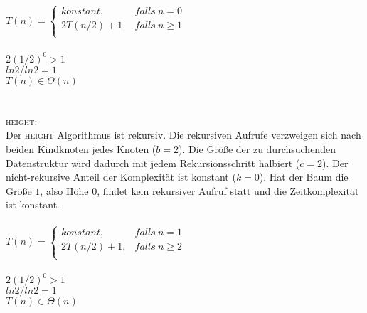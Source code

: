 \documentclass{article}
\begin{document}
$T(n) =
\begin{cases}
konstant, &falls\ n = 0\\
2T(n/2) + 1, &falls\ n \geq 1\\
\end{cases}$\\\\
$2(1/2)^0 > 1$\\
$ln 2 / ln 2 = 1$\\
$T(n) \in \Theta(n)$\\\\\\
\textsc {height}:\\
Der \textsc {height} Algorithmus ist rekursiv. Die rekursiven Aufrufe verzweigen sich nach beiden Kindknoten jedes Knoten ($b = 2$). Die Größe der zu durchsuchenden Datenstruktur wird dadurch mit jedem Rekursionsschritt halbiert ($c = 2$). Der nicht-rekursive Anteil der Komplexität ist konstant ($k = 0$). Hat der Baum die Größe $1$, also Höhe $0$, findet kein rekursiver Aufruf statt und die Zeitkomplexität ist konstant.\\\\
$T(n) =
\begin{cases}
konstant, &falls\ n = 1\\
2T(n/2) + 1, &falls\ n \geq 2\\
\end{cases}$\\\\
$2(1/2)^0 > 1$\\
$ln 2 / ln 2 = 1$\\
$T(n) \in \Theta(n)$
\end{document}
